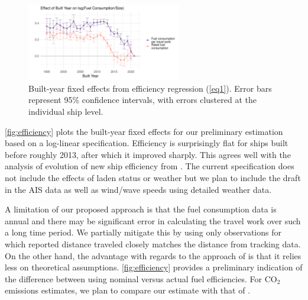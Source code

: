 \documentclass[hidelinks, 12pt,letterpaper]{article}
\begin{document}
 \begin{figure}[h]
  \centering 
  \includegraphics[width = 0.6\textwidth]{Efficiency_Regression_Size_Built_coefs_1and3_ggplot.png}
  \caption{Built-year fixed effects from efficiency regression (\ref{eq1}). Error bars represent 95\% confidence intervals, with errors clustered at the individual ship level.}
  \label{fig:efficiency}
\end{figure} 

 \autoref{fig:efficiency} plots the built-year fixed effects for our preliminary estimation based on a log-linear specification. Efficiency is surprisingly flat for ships built before roughly 2013, after which it improved sharply. This agrees well with the analysis of evolution of new ship efficiency from \citet[][Figure 15]{faber2015historical}. The current specification does not include the effects of laden status or weather but we plan to include the draft in the AIS data as well as wind/wave speeds using detailed weather data. %



A limitation of our proposed approach is that the fuel consumption data is annual and there may be significant error in calculating the travel work over such a long time period. We partially mitigate this by using only observations for which reported distance traveled closely matches the distance from tracking data. On the other hand, the advantage with regards to the approach of \citet{faber2020fourth} is that it relies less on theoretical assumptions. \autoref{fig:efficiency} provides a preliminary indication of the difference between using nominal versus actual fuel efficiencies. For CO$_2$ emissions estimates, we plan to compare our estimate with that of \citet{faber2020fourth}. %
\end{document}
